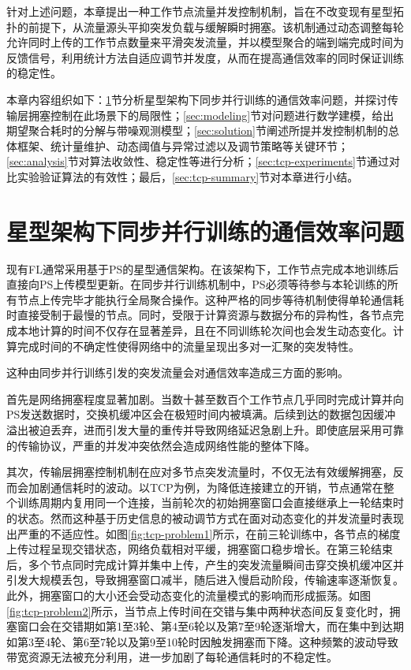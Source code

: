 \documentclass[master, vlined]{DissertUESTC}
\begin{document}
	针对上述问题，本章提出一种工作节点流量并发控制机制，旨在不改变现有星型拓扑的前提下，从流量源头平抑突发负载与缓解瞬时拥塞。该机制通过动态调整每轮允许同时上传的工作节点数量来平滑突发流量，并以模型聚合的端到端完成时间为反馈信号，利用统计方法自适应调节并发度，从而在提高通信效率的同时保证训练的稳定性。

	本章内容组织如下：\ref{sec:tcp-problems}节分析星型架构下同步并行训练的通信效率问题，并探讨传输层拥塞控制在此场景下的局限性；\ref{sec:modeling}节对问题进行数学建模，给出期望聚合耗时的分解与带噪观测模型；\ref{sec:solution}节阐述所提并发控制机制的总体框架、统计量维护、动态阈值与异常过滤以及调节策略等关键环节；\ref{sec:analysis}节对算法收敛性、稳定性等进行分析；\ref{sec:tcp-experiments}节通过对比实验验证算法的有效性；最后，\ref{sec:tcp-summary}节对本章进行小结。

	\section{星型架构下同步并行训练的通信效率问题}
	\label{sec:tcp-problems}

	现有FL通常采用基于PS的星型通信架构。在该架构下，工作节点完成本地训练后直接向PS上传模型更新。在同步并行训练机制中，PS必须等待参与本轮训练的所有节点上传完毕才能执行全局聚合操作。这种严格的同步等待机制使得单轮通信耗时直接受制于最慢的节点。同时，受限于计算资源与数据分布的异构性，各节点完成本地计算的时间不仅存在显著差异，且在不同训练轮次间也会发生动态变化。计算完成时间的不确定性使得网络中的流量呈现出多对一汇聚的突发特性。

	这种由同步并行训练引发的突发流量会对通信效率造成三方面的影响。

	首先是网络拥塞程度显著加剧。当数十甚至数百个工作节点几乎同时完成计算并向PS发送数据时，交换机缓冲区会在极短时间内被填满。后续到达的数据包因缓冲溢出被迫丢弃，进而引发大量的重传并导致网络延迟急剧上升。即使底层采用可靠的传输协议，严重的并发冲突依然会造成网络性能的整体下降。

	其次，传输层拥塞控制机制在应对多节点突发流量时，不仅无法有效缓解拥塞，反而会加剧通信耗时的波动。以TCP为例，为降低连接建立的开销，节点通常在整个训练周期内复用同一个连接，当前轮次的初始拥塞窗口会直接继承上一轮结束时的状态。然而这种基于历史信息的被动调节方式在面对动态变化的并发流量时表现出严重的不适应性。如图\ref{fig:tcp-problem1}所示，在前三轮训练中，各节点的梯度上传过程呈现交错状态，网络负载相对平缓，拥塞窗口稳步增长。在第三轮结束后，多个节点同时完成计算并集中上传，产生的突发流量瞬间击穿交换机缓冲区并引发大规模丢包，导致拥塞窗口减半，随后进入慢启动阶段，传输速率逐渐恢复。此外，拥塞窗口的大小还会受动态变化的流量模式的影响而形成振荡。如图\ref{fig:tcp-problem2}所示，当节点上传时间在交错与集中两种状态间反复变化时，拥塞窗口会在交错期如第1至3轮、第4至6轮以及第7至9轮逐渐增大，而在集中到达期如第3至4轮、第6至7轮以及第9至10轮时因触发拥塞而下降。这种频繁的波动导致带宽资源无法被充分利用，进一步加剧了每轮通信耗时的不稳定性。
\end{document}
